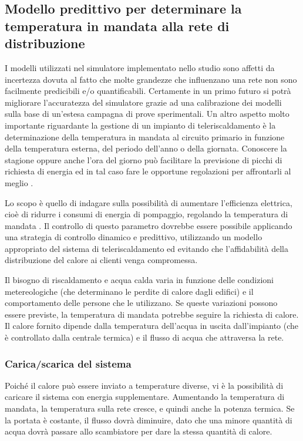 \documentclass[laurea,oneside,11pt]{USiena_tesiLM3}
\begin{document}
\subsection{Modello predittivo per determinare la temperatura in mandata alla rete di distribuzione}
I modelli utilizzati nel simulatore implementato nello studio sono affetti da incertezza dovuta al fatto che molte grandezze che influenzano una rete non sono facilmente predicibili e/o quantificabili.
Certamente in un primo futuro si potrà migliorare l'accuratezza del simulatore grazie ad una calibrazione dei modelli sulla base di un'estesa campagna di prove sperimentali. 
Un altro aspetto molto importante riguardante la gestione di un impianto di teleriscaldamento è la determinazione della temperatura in mandata al circuito primario in funzione della temperatura esterna, del periodo dell'anno o della giornata. Conoscere la stagione oppure anche l'ora del giorno può facilitare la previsione di picchi di richiesta di energia ed in tal caso fare le opportune regolazioni per affrontarli al meglio \cite{sandou2005predictive}.

Lo scopo è quello di indagare sulla possibilità di aumentare l'efficienza elettrica, cioè di ridurre i consumi di energia di pompaggio, regolando la temperatura di mandata \cite{zinko}.
Il controllo di questo parametro dovrebbe essere possibile applicando una strategia di controllo dinamico e predittivo, utilizzando un modello appropriato del sistema di teleriscaldamento ed evitando che l'affidabilità della distribuzione del calore ai clienti venga compromessa.

Il bisogno di riscaldamento e acqua calda varia in funzione delle condizioni metereologiche (che determinano le perdite di calore dagli edifici) e il comportamento delle persone che le utilizzano. Se queste variazioni possono essere previste, la temperatura di mandata potrebbe seguire la richiesta di calore. Il calore fornito  dipende dalla temperatura dell'acqua in uscita dall'impianto (che è controllato dalla centrale termica) e il flusso di acqua che attraversa la rete. 

\subsubsection{Carica/scarica del sistema}
Poiché il calore può essere inviato a temperature diverse, vi è la possibilità di caricare il sistema con energia supplementare.
Aumentando la temperatura di mandata, la temperatura sulla rete cresce, e quindi anche la potenza termica. Se la portata è costante, il flusso dovrà diminuire, dato che una minore quantità di acqua dovrà passare allo scambiatore per dare la stessa quantità di calore. 
\end{document}
